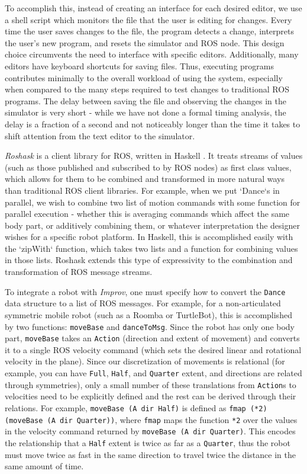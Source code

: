 \documentclass[sigconf]{acmart}
\begin{document}
To accomplish this, instead of creating an interface for each desired
editor, we use a shell script which monitors the file that the user is
editing for changes. Every time the user saves changes to the file, the
program detects a change, interprets the user's new program, and resets
the simulator and ROS node. This design choice circumvents the need to
interface with specific editors. Additionally, many editors have
keyboard shortcuts for saving files. Thus, executing programs
contributes minimally to the overall workload of using the system,
especially when compared to the many steps required to test changes to
traditional ROS programs. The delay between saving the file and observing the
changes in the simulator is very short - while we have not done a formal timing
analysis, the delay is a fraction of a second and not noticeably longer than the
time it takes to shift attention from the text editor to the simulator.

\emph{Roshask} is a client library for ROS, written in Haskell
\cite{cowley2011stream}. It treats streams of values (such as those published
and subscribed to by ROS nodes) as first class values, which allows for them to
be combined and transformed in more natural ways than traditional ROS client
libraries. For example, when we put `Dance`s in parallel, we wish to combine two
list of motion commands with some function for parallel execution - whether this
is averaging commands which affect the same body part, or additively combining
them, or whatever interpretation the designer wishes for a specific robot
platform. In Haskell, this is accomplished easily with the
`zipWith` function, which takes two lists and a function for combining values in
those lists. Roshask extends this type of expressivity to the combination and
transformation of ROS message streams.

To integrate a robot with \emph{Improv}, one must
specify how to convert the \texttt{Dance} data structure to a list of ROS
messages. For example, for a non-articulated symmetric mobile robot (such as a Roomba or
TurtleBot), this is accomplished by two functions: \texttt{moveBase} and
\texttt{danceToMsg}. Since the robot has only one body part, \texttt{moveBase}
takes an \texttt{Action} (direction and extent of movement) and converts it to a
single ROS velocity command (which sets the desired linear and rotational
velocity in the plane). Since our discretization of movements is relational (for
example, you can have \texttt{Full}, \texttt{Half}, and \texttt{Quarter} extent,
and directions are related through symmetries), only a small number of these
translations from \texttt{Action}s to velocities need to be explicitly defined
and the rest can be derived through their relations. For example,
\texttt{moveBase (A dir Half)} is defined as \texttt{fmap (*2) (moveBase (A dir
Quarter))},
where \texttt{fmap} maps the function \texttt{*2} over the values in the velocity
command returned by \texttt{moveBase (A dir Quarter)}. This encodes the relationship
that a \texttt{Half} extent is twice as far as a \texttt{Quarter}, thus the
robot must move twice as fast in the same direction to travel twice the distance
in the same amount of time.
\end{document}
